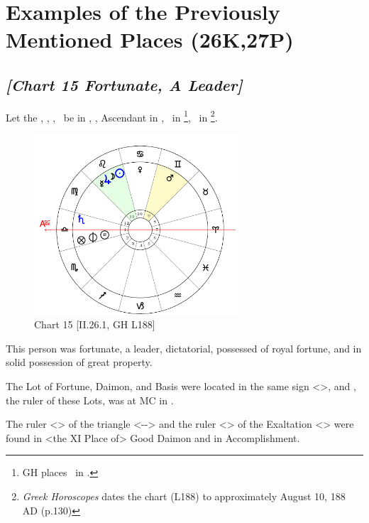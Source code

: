 \section{Examples of the Previously Mentioned Places (26K,27P)}

\subsection*{\textit{[Chart 15 Fortunate, A Leader]}}

Let the \Sun, \Moon, \Jupiter, \Mercury\, be in \Leo, \Saturn, Ascendant in \Libra, \Mars\, in \Gemini \footnote{GH places \Mars\, in \Aquarius.}, \Venus\, in \Cancer
\footnote{\textit{Greek Horoscopes} dates the chart (L188) to approximately August 10, 188 AD (p.130)}.

\clearpage
\begin{figure}
\centering
\includegraphics[width=0.68\textwidth]{charts/2_26_1}
\caption{Chart 15 [II.26.1, GH L188]}
\label{fig:chart15}
\end{figure}

This person was fortunate, a leader, dictatorial, possessed of royal fortune, and in solid possession of great property. 

The Lot of Fortune, Daimon, and Basis were located in the same sign <\Libra>, and \Venus, the ruler of these Lots, was at MC in \Cancer. 

The ruler <\Jupiter> of the triangle <\Leo-\Aries-\Sagittarius> and the ruler <\Mercury> of the Exaltation <\Gemini> were found in <the XI Place of> Good Daimon and in Accomplishment.

